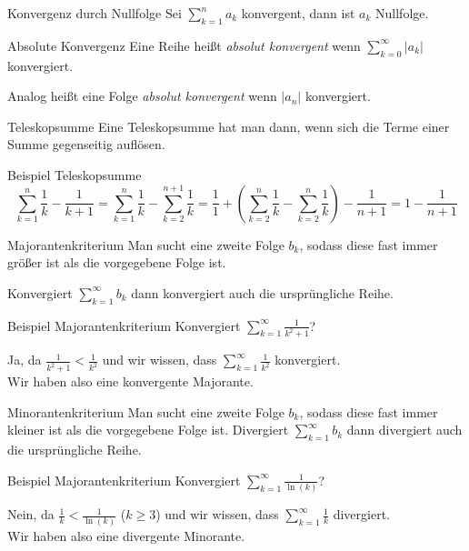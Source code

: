 \documentclass[german]{spicker}
\begin{document}
\begin{bonus}{Konvergenz durch Nullfolge}
    Sei $\sum^n_{k=1}a_k$ konvergent, dann ist $a_k$ Nullfolge.
\end{bonus}

\begin{defi}{Absolute Konvergenz}
    Eine Reihe heißt \emph{absolut konvergent} wenn $\sum_{k=0}^{\infty} |a_k|$ konvergiert.

    Analog heißt eine Folge \emph{absolut konvergent} wenn $|a_n|$ konvergiert.
\end{defi}

\begin{algo}{Teleskopsumme}
    Eine Teleskopsumme hat man dann, wenn sich die Terme einer Summe gegenseitig auflösen.
\end{algo}

\begin{bonus}{Beispiel Teleskopsumme}
    \[
        \sum_{k=1}^n \frac{1}{k} - \frac{1}{k+1} = \sum_{k=1}^n \frac{1}{k} - \sum_{k=2}^{n+1} \frac{1}{k} = \frac{1}{1} +\left( \sum_{k=2}^n \frac{1}{k} - \sum_{k=2}^n \frac{1}{k} \right) - \frac{1}{n+1} = 1-\frac{1}{n+1}
    \]
\end{bonus}

\begin{algo}{Majorantenkriterium}
    Man sucht eine zweite Folge $b_k$, sodass diese fast immer größer ist als die vorgegebene Folge ist.

    Konvergiert $\sum_{k=1}^{\infty} b_k$ dann konvergiert auch die ursprüngliche Reihe.
\end{algo}

\begin{bonus}{Beispiel Majorantenkriterium}
    Konvergiert $\sum_{k=1}^{\infty} \frac{1}{k^2+1}$?

    Ja, da $\frac{1}{k^2+1} < \frac{1}{k^2}$ und wir wissen, dass $\sum_{k=1}^{\infty} \frac{1}{k^2}$ konvergiert.\\
    Wir haben also eine konvergente Majorante.
\end{bonus}

\begin{algo}{Minorantenkriterium}
    Man sucht eine zweite Folge $b_k$, sodass diese fast immer kleiner ist als die vorgegebene Folge ist.
    Divergiert $\sum_{k=1}^{\infty} b_k$ dann divergiert auch die ursprüngliche Reihe.
\end{algo}

\begin{bonus}{Beispiel Majorantenkriterium}
    Konvergiert $\sum_{k=1}^{\infty} \frac{1}{\ln(k)}$?

    Nein, da $\frac{1}{k} < \frac{1}{\ln(k)}$ ($k\geq3$) und wir wissen, dass $\sum_{k=1}^{\infty} \frac{1}{k}$ divergiert.\\
    Wir haben also eine divergente Minorante.
\end{bonus}
\end{document}

